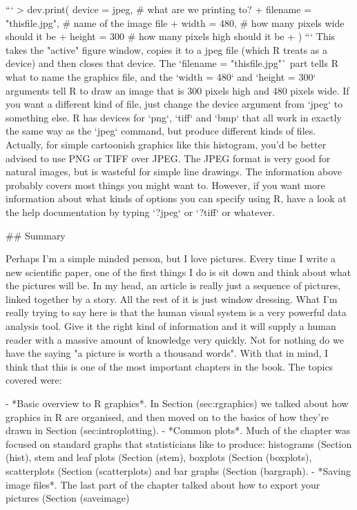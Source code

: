 ```
> dev.print( device = jpeg,              # what are we printing to?
+            filename = "thisfile.jpg",  # name of the image file
+            width = 480,                # how many pixels wide should it be
+            height = 300                # how many pixels high should it be
+ )
```
This takes the "active" figure window, copies it to a jpeg file (which R treats as a device) and then closes that device. The `filename = "thisfile.jpg"` part tells R what to name the graphics file, and the `width = 480` and `height = 300` arguments tell R to draw an image that is 300 pixels high and 480 pixels wide. If you want a different kind of file, just change the device argument from `jpeg` to something else. R has devices for `png`, `tiff` and `bmp` that all work in exactly the same way as the `jpeg` command, but produce different kinds of files. Actually, for simple cartoonish graphics like this histogram, you'd be better advised to use PNG or TIFF over JPEG. The JPEG format is very good for natural images, but is wasteful for simple line drawings. The information above probably covers most things you might want to. However, if you want more information about what kinds of options you can specify using R, have a look at the help documentation by typing `?jpeg` or `?tiff` or whatever.


## Summary

Perhaps I'm a simple minded person, but I love pictures. Every time I write a new scientific paper, one of the first things I do is sit down and think about what the pictures will be. In my head, an article is really just a sequence of pictures, linked together by a story. All the rest of it is just window dressing. What I'm really trying to say here is that the human visual system is a very powerful data analysis tool. Give it the right kind of information and it will supply a human reader with a massive amount of knowledge very quickly. Not for nothing do we have the saying "a picture is worth a thousand words". With that in mind, I think that this is one of the most important chapters in the book. The topics covered were:


- *Basic overview to R graphics*. In Section \@ref(sec:rgraphics) we talked about how graphics in R are organised, and then moved on to the basics of how they're drawn in Section \@ref(sec:introplotting).
- *Common plots*. Much of the chapter was focused on standard graphs that statisticians like to produce: histograms (Section \@ref(hist), stem and leaf plots (Section \@ref(stem), boxplots (Section \@ref(boxplots), scatterplots (Section \@ref(scatterplots) and bar graphs (Section \@ref(bargraph).
- *Saving image files*. The last part of the chapter talked about how to export your pictures (Section \@ref(saveimage)
 


